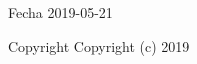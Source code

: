 \begin{DoxyDate}{Fecha}
2019-\/05-\/21
\end{DoxyDate}
\begin{DoxyCopyright}{Copyright}
Copyright (c) 2019 
\end{DoxyCopyright}
